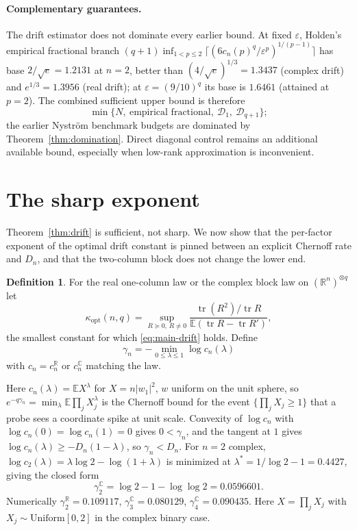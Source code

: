 \documentclass[11pt,a4paper]{article}
\theoremstyle{definition}\newtheorem{definition}[theorem]{Definition}
\theoremstyle{remark}\newtheorem{remark}[theorem]{Remark}
\numberwithin{equation}{section}
\newcommand{\E}{\mathbb E}
\newcommand{\R}{\mathbb R}
\newcommand{\C}{\mathbb C}
\newcommand{\tr}{\operatorname{tr}}
\newcommand{\eps}{\varepsilon}
\newcommand{\opt}{\mathrm{opt}}
\begin{document}
\paragraph{Complementary guarantees.}
The drift estimator does not dominate every earlier bound. At fixed $\eps$,
Holden's empirical fractional branch
$(q+1)\inf_{1<p\le2}\lceil(6c_n(p)^q/\eps^p)^{1/(p-1)}\rceil$ has base $2/\sqrt e=1.2131$
at $n=2$, better than $(4/\sqrt e)^{1/3}=1.3437$ (complex drift) and $e^{1/3}=1.3956$
(real drift); at $\eps=(9/10)^q$ its base is $1.6461$ (attained at $p=2$). The
combined sufficient upper bound is therefore
\[
 \min\{N,\ \text{empirical fractional},\ \mathcal D_1,\ \mathcal D_{q+1}\};
\]
the earlier Nystr\"om benchmark budgets are dominated by
Theorem~\ref{thm:domination}. Direct diagonal control remains an additional
available bound, especially when low-rank approximation is inconvenient.

\section{The sharp exponent}\label{sec:sharp}
Theorem~\ref{thm:drift} is sufficient, not sharp. We now show that the
per-factor exponent of the optimal drift constant is pinned between an explicit
Chernoff rate and $D_n$, and that the two-column block does not change the
lower end.

\begin{definition}
For the real one-column law or the complex block law on $(\R^n)^{\otimes q}$ let
\[
 \kappa_\opt(n,q)=\sup_{R\succeq0,\,R\ne0}\frac{\tr(R^2)/\tr R}{\E(\tr R-\tr R')},
\]
the smallest constant for which \eqref{eq:main-drift} holds. Define
\[
 \gamma_n=-\min_{0\le\lambda\le1}\log c_n(\lambda)
\]
with $c_n=c_n^{\R}$ or $c_n^{\C}$ matching the law.
\end{definition}

Here $c_n(\lambda)=\E X^\lambda$ for $X=n|w_1|^2$, $w$ uniform on the unit sphere,
so $e^{-q\gamma_n}=\min_\lambda\E\prod_jX_j^\lambda$ is the Chernoff bound for the event
$\{\prod_jX_j\ge1\}$ that a probe sees a coordinate spike at unit scale.
Convexity of $\log c_n$ with $\log c_n(0)=\log c_n(1)=0$ gives $0<\gamma_n$, and
the tangent at $1$ gives $\log c_n(\lambda)\ge-D_n(1-\lambda)$, so $\gamma_n<D_n$.
For $n=2$ complex, $\log c_2(\lambda)=\lambda\log2-\log(1+\lambda)$ is minimized at
$\lambda^*=1/\log2-1=0.4427$, giving the closed form
\[
 \gamma_2^{\C}=\log2-1-\log\log2=0.0596601 .
\]
Numerically $\gamma_2^{\R}=0.109117$, $\gamma_3^{\C}=0.080129$, $\gamma_4^{\C}=0.090435$.
Here $X=\prod_jX_j$ with $X_j\sim\mathrm{Uniform}[0,2]$ in the complex binary case.
\end{document}
